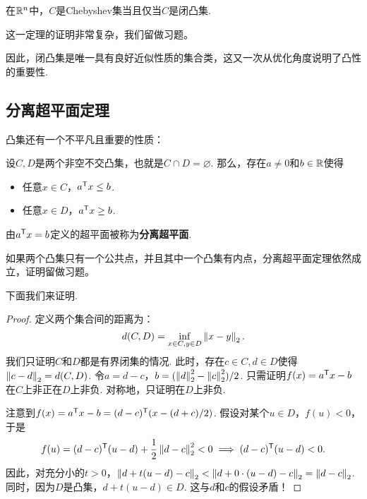 \begin{theorem}
    在$\mathbb{R}^n$中，$C$是Chebyshev集当且仅当$C$是闭凸集.
\end{theorem}
这一定理的证明非常复杂，我们留做习题。

因此，闭凸集是唯一具有良好近似性质的集合类，这又一次从优化角度说明了凸性的重要性.

\subsection{分离超平面定理}


凸集还有一个不平凡且重要的性质：
\begin{theorem}[分离超平面定理]\label{thm:separation-hyperplane}
设$C,D$是两个非空不交凸集，也就是$C\cap D=\varnothing$. 那么，存在$a\neq 0$和$b\in\mathbb{R}$使得
\begin{itemize}
    \item 任意$x\in C$，$a^{\mathsf{T}} x\leq b$.
    \item 任意$x\in D$，$a^{\mathsf{T}} x\geq b$.
\end{itemize}
由$a^{\mathsf{T}} x=b$定义的超平面被称为\textbf{分离超平面}.
\end{theorem}
如果两个凸集只有一个公共点，并且其中一个凸集有内点，分离超平面定理依然成立，证明留做习题。

下面我们来证明.

\begin{proof}
定义两个集合间的距离为：
\[d(C,D)=\inf_{x\in C,y\in D}\left\|x-y\right\|_2.\]
我们只证明$C$和$D$都是有界闭集的情况. 此时，存在$c\in C,d\in D$使得$\left\|c-d\right\|_2=d(C,D)$.
令$a=d-c$，$b=(\left\|d\right\|_2^2-\left\|c\right\|_2^2)/2$.
只需证明$f(x)=a^{\mathsf{T}} x-b$在$C$上非正在$D$上非负. 对称地，只证明在$D$上非负.

注意到$f(x)=a^{\mathsf{T}} x-b=(d-c)^{\mathsf{T}}(x-(d+c)/2)$.
假设对某个$u\in D$，$f(u)<0$，于是
\[f(u)=(d-c)^{\mathsf{T}}(u-d)+\frac{1}{2}\left\|d-c\right\|_2^2<0\implies(d-c)^{\mathsf{T}}(u-d)<0.\]
因此，对充分小的$t>0$，$\left\|d+t(u-d)-c\right\|_2<\left\|d+0\cdot(u-d)-c\right\|_2=\left\|d-c\right\|_2$. 同时，因为$D$是凸集，$d+t(u-d)\in D$.
这与$d$和$c$的假设矛盾！
\end{proof}
